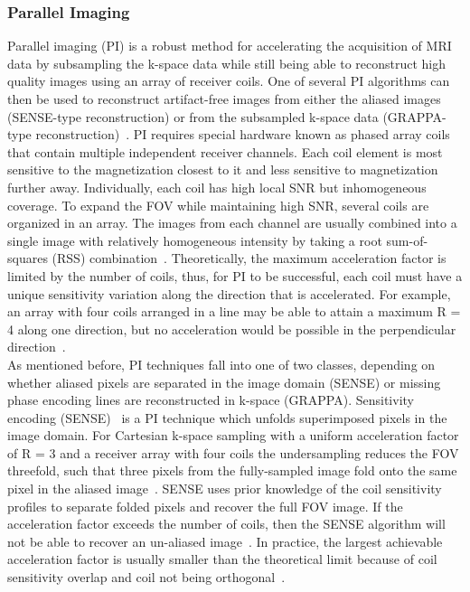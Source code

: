 \subsubsection{Parallel Imaging}
Parallel imaging (PI) is a robust method for accelerating the acquisition of MRI data by subsampling the k-space data while still being able to reconstruct high quality images using an array of receiver coils. One of several PI algorithms can then be used to reconstruct artifact-free images from either the aliased images (SENSE-type reconstruction) or from the subsampled k-space data (GRAPPA-type reconstruction)~\cite{AdvancesPI}. PI requires special hardware known as phased array coils that contain multiple independent receiver channels. Each coil element is most sensitive to the magnetization closest to it and less sensitive to magnetization further away. Individually, each coil has high local SNR but inhomogeneous coverage. To expand the FOV while maintaining high SNR, several coils are organized in an array. The images from each channel are usually combined into a single image with relatively homogeneous intensity by taking a root sum-of-squares (RSS) combination~\cite{DeepMRIReconstructionSubsampling}. Theoretically, the maximum acceleration factor is limited by the number of coils, thus, for PI to be successful, each coil must have a unique sensitivity variation along the direction that is accelerated. For example, an array with four coils arranged in a line may be able to attain a maximum R = 4 along one direction, but no acceleration would be possible in the perpendicular direction~\cite{AdvancesPI}.\\
As mentioned before, PI techniques fall into one of two classes, depending on whether aliased pixels are separated in the image domain (SENSE) or missing phase encoding lines are reconstructed in k-space (GRAPPA). Sensitivity encoding (SENSE)~\cite{SENSE1} is a PI technique which unfolds superimposed pixels in the image domain. For Cartesian k-space sampling with a uniform acceleration factor of R = 3 and a receiver array with four coils the undersampling reduces the FOV threefold, such that three pixels from the fully-sampled image fold onto the same pixel in the aliased image~\cite{AdvancesPI}. SENSE uses prior knowledge of the coil sensitivity profiles to separate folded pixels and recover the full FOV image. If the acceleration factor exceeds the number of coils, then the SENSE algorithm will not be able to recover an un-aliased image~\cite{ParallelMRI}. In practice, the largest achievable acceleration factor is usually smaller than the theoretical limit because of coil sensitivity overlap and coil not being orthogonal~\cite{AdvancesPI}.\\

